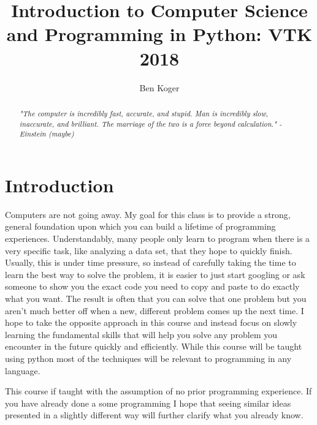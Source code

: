 \documentclass[]{article}
\title{Introduction to Computer Science and Programming in Python: VTK 2018}
\author{Ben Koger}
\begin{document}
\maketitle

\begin{abstract}
	
	\textit{ "The computer is incredibly fast, accurate, and stupid. Man is incredibly slow, inaccurate, and brilliant. The marriage of the two is a force beyond calculation." -  Einstein (maybe) }

\end{abstract}

\tableofcontents

\newpage

\section{ Introduction }

Computers are not going away.  My goal for this class is to provide a strong, general foundation upon which you can build a lifetime of programming experiences.  Understandably, many people only learn to program when there is a very specific task, like analyzing a data set, that they hope to quickly finish.  Usually, this is under time pressure, so instead of carefully taking the time to learn the best way to solve the problem, it is easier to just start googling or ask someone to show you the exact code you need to copy and paste to do exactly what you want.  The result is often that you can solve that one problem but you aren't much better off when a new, different problem comes up the next time.  I hope to take the opposite approach in this course and instead focus on slowly learning the fundamental skills that will help you solve any problem you encounter in the future quickly and efficiently. While this course will be taught using python most of the techniques will be relevant to programming in any language.       

This course if taught with the assumption of no prior programming experience.  If you have already done a some programming I hope that seeing similar ideas presented in a slightly different way will further clarify what you already know.  
\end{document}
